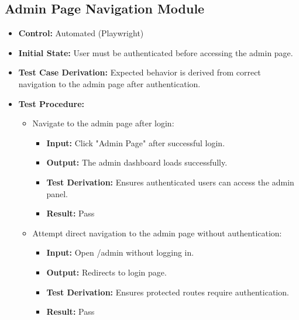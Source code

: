 \documentclass[12pt, titlepage]{article}
\begin{document}
\subsection{Admin Page Navigation Module}
\begin{itemize}
    \item \textbf{Control: }Automated (Playwright)
    \item \textbf{Initial State: }User must be authenticated before accessing the admin page.
    \item \textbf{Test Case Derivation: }Expected behavior is derived from correct navigation to the admin page after authentication.
    \item \textbf{Test Procedure: }
    \begin{itemize}
        \item Navigate to the admin page after login:
        \begin{itemize}
            \item \textbf{Input: }Click "Admin Page" after successful login.
            \item \textbf{Output: }The admin dashboard loads successfully.
            \item \textbf{Test Derivation: }Ensures authenticated users can access the admin panel.
            \item \textbf{Result: }Pass
        \end{itemize}
        \item Attempt direct navigation to the admin page without authentication:
        \begin{itemize}
            \item \textbf{Input: }Open /admin without logging in.
            \item \textbf{Output: }Redirects to login page.
            \item \textbf{Test Derivation: }Ensures protected routes require authentication.
            \item \textbf{Result: }Pass
        \end{itemize}
    \end{itemize}
\end{itemize}
\end{document}
